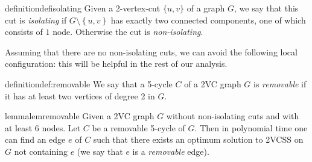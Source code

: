\documentclass{theoretics}
\newcommand{\set}[1]{\left\{#1 \right\}}
\begin{document}
\begin{restatable}{definition}{defisolating}
Given a 2-vertex-cut $\{u,v\}$ of a graph $G$, we say that this cut is \emph{isolating} if $G\setminus\set{u,v}$ has exactly two connected components, one of which consists of $1$ node. Otherwise the cut is \emph{non-isolating}.
\end{restatable}
Assuming that there are no non-isolating cuts, we can avoid the following local configuration: this will be helpful in the rest of our analysis.
\begin{restatable}{definition}{def:removable}
    We say that a 5-cycle $C$ of a 2VC graph $G$ is \emph{removable} if it has at least two vertices of degree 2 in $G$.
\end{restatable}
\begin{restatable}{lemma}{lemremovable}\label{lem:removable}
    Given a 2VC graph $G$ without non-isolating cuts and with at least $6$ nodes. Let $C$ be a removable 5-cycle of $G$. Then in polynomial time one can find an edge $e$ of $C$ such that there exists an optimum solution to 2VCSS on $G$ not containing $e$ (we say that $e$ is a \emph{removable} edge).
\end{restatable}
\end{document}
